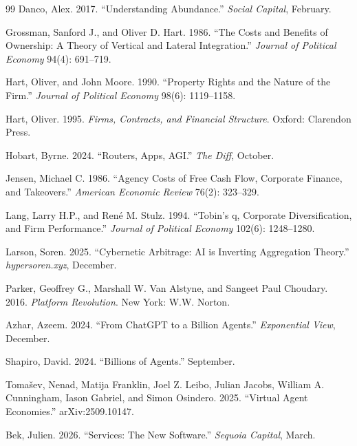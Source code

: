 \documentclass[12pt]{article}
\theoremstyle{definition}
\begin{document}
\begin{thebibliography}{99}
Danco, Alex. 2017. ``Understanding Abundance.'' \textit{Social Capital}, February.

Grossman, Sanford J., and Oliver D. Hart. 1986. ``The Costs and Benefits of Ownership: A Theory of Vertical and Lateral Integration.'' \textit{Journal of Political Economy} 94(4): 691--719.

Hart, Oliver, and John Moore. 1990. ``Property Rights and the Nature of the Firm.'' \textit{Journal of Political Economy} 98(6): 1119--1158.

Hart, Oliver. 1995. \textit{Firms, Contracts, and Financial Structure}. Oxford: Clarendon Press.

Hobart, Byrne. 2024. ``Routers, Apps, AGI.'' \textit{The Diff}, October.

Jensen, Michael C. 1986. ``Agency Costs of Free Cash Flow, Corporate Finance, and Takeovers.'' \textit{American Economic Review} 76(2): 323--329.

Lang, Larry H.P., and Ren\'{e} M. Stulz. 1994. ``Tobin's q, Corporate Diversification, and Firm Performance.'' \textit{Journal of Political Economy} 102(6): 1248--1280.

Larson, Soren. 2025. ``Cybernetic Arbitrage: AI is Inverting Aggregation Theory.'' \textit{hypersoren.xyz}, December.

Parker, Geoffrey G., Marshall W. Van Alstyne, and Sangeet Paul Choudary. 2016. \textit{Platform Revolution}. New York: W.W. Norton.

Azhar, Azeem. 2024. ``From ChatGPT to a Billion Agents.'' \textit{Exponential View}, December.

Shapiro, David. 2024. ``Billions of Agents.'' September.

Toma\v{s}ev, Nenad, Matija Franklin, Joel Z. Leibo, Julian Jacobs, William A. Cunningham, Iason Gabriel, and Simon Osindero. 2025. ``Virtual Agent Economies.'' arXiv:2509.10147.

Bek, Julien. 2026. ``Services: The New Software.'' \textit{Sequoia Capital}, March.


\end{thebibliography}
\end{document}
